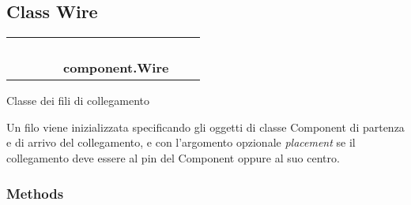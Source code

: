 \subsection{Class Wire}

    \label{component:Wire}
\begin{tabular}{cccccccc}
\multicolumn{2}{r}{\settowidth{\BCL}{object}\multirow{2}{\BCL}{object}}
&&
&&
  \\\cline{3-3}
  &&\multicolumn{1}{c|}{}
&&
&&
  \\
\multicolumn{4}{r}{\settowidth{\BCL}{component.Component}\multirow{2}{\BCL}{component.Component}}
&&
  \\\cline{5-5}
  &&&&\multicolumn{1}{c|}{}
&&
  \\
&&&&\multicolumn{2}{l}{\textbf{component.Wire}}
\end{tabular}

Classe dei fili di collegamento

Un filo viene inizializzata specificando gli oggetti di classe Component di
partenza e di arrivo del collegamento, e con l'argomento opzionale 
\textit{placement} se il collegamento deve essere al pin del Component 
oppure al suo centro.



  \subsubsection{Methods}

    \vspace{0.5ex}

